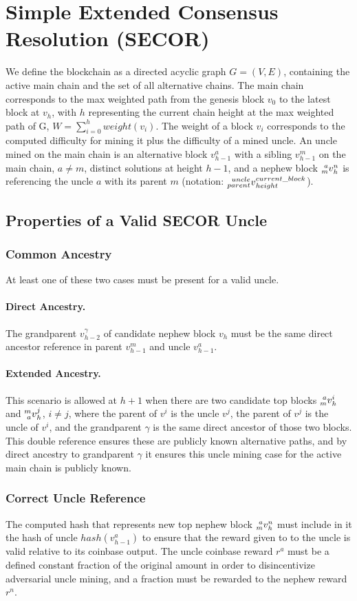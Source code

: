 \documentclass{article}
\begin{document}
\section{Simple Extended Consensus Resolution (SECOR)}
We define the blockchain as a directed acyclic graph $G = (V, E)$, containing the active main chain and the set of all alternative chains. The main chain corresponds to the max weighted path from the genesis block $v_0$ to the latest block at $v_h$, with $h$ representing the current chain height at the max weighted path of G, $W = \sum_{i=0}^{h} weight(v_i)$. The weight of a block $v_i$ corresponds to the computed difficulty for mining it plus the difficulty of a mined uncle. An uncle mined on the main chain is an alternative block $v_{h-1}^a$ with a sibling $v_{h-1}^m$ on the main chain, $a \neq m$, distinct solutions at height $h-1$, and a nephew block $\prescript{a}{m}v_h^n$ is referencing the uncle $a$ with its parent $m$ (notation: $\prescript{uncle}{parent}v_{height}^{current\_block}$).
\subsection{Properties of a Valid SECOR Uncle}
\subsubsection{Common Ancestry}
At least one of these two cases must be present for a valid uncle.
\paragraph{Direct Ancestry.}
The grandparent $v_{h-2}^{\gamma}$ of candidate nephew block $v_h$ must be the same direct ancestor reference in parent $v_{h-1}^m$ and uncle $v_{h-1}^a$.
\paragraph{Extended Ancestry.}
This scenario is allowed at $h+1$ when there are two candidate top blocks $\prescript{a}{m}v_h^i$ and $\prescript{m}{a}v_h^j$, $i \neq j$, where the parent of $v^i$ is the uncle $v^j$, the parent of $v^j$ is the uncle of $v^i$, and the grandparent $\gamma$ is the same direct ancestor of those two blocks. This double reference ensures these are publicly known alternative paths, and by direct ancestry to grandparent $\gamma$ it ensures this uncle mining case for the active main chain is publicly known.
\subsubsection{Correct Uncle Reference}
The computed hash that represents new top nephew block $\prescript{a}{m}v_h^n$ must include in it the hash of uncle $hash(v_{h-1}^a)$ to ensure that the reward given to to the uncle is valid relative to its coinbase output. The uncle coinbase reward $r^a$ must be a defined constant fraction of the original amount in order to disincentivize adversarial uncle mining, and a fraction must be rewarded to the nephew reward $r^n$.
\end{document}
